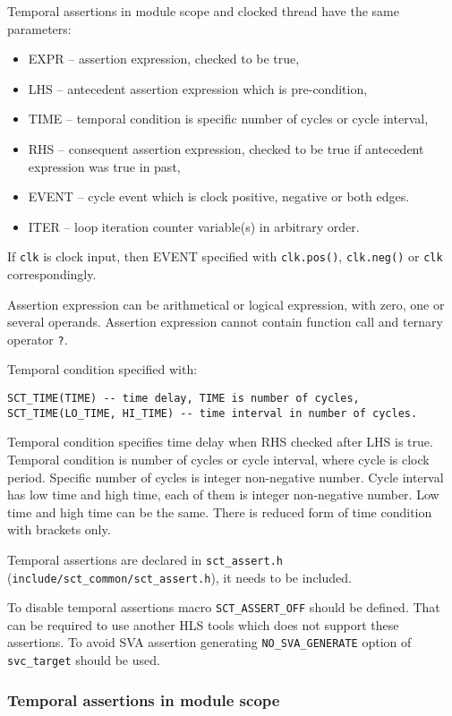 Temporal assertions in module scope and clocked thread have the same parameters:
\begin{itemize}
\item EXPR -- assertion expression, checked to be true,
\item LHS -- antecedent assertion expression which is pre-condition, 
\item TIME -- temporal condition is specific number of cycles or cycle interval,
\item RHS -- consequent assertion expression, checked to be true if antecedent expression was true in past,
\item EVENT -- cycle event which is clock positive, negative or both edges.
\item ITER -- loop iteration counter variable(s) in arbitrary order.
\end{itemize}

If {\tt clk} is clock input, then EVENT specified with {\tt clk.pos()}, {\tt clk.neg()} or {\tt clk} correspondingly. 

Assertion expression can be arithmetical or logical expression, with zero, one or several operands. Assertion expression cannot contain function call and ternary operator {\tt ?}.

Temporal condition specified with:
\begin{lstlisting}[style=mycpp]
SCT_TIME(TIME) -- time delay, TIME is number of cycles,
SCT_TIME(LO_TIME, HI_TIME) -- time interval in number of cycles.
\end{lstlisting}

Temporal condition specifies time delay when RHS checked after LHS is true. Temporal condition is number of cycles or cycle interval, where cycle is clock period. Specific number of cycles is integer non-negative number. Cycle interval has low time and high time, each of them is integer non-negative number. Low time and high time can be the same. There is reduced form of time condition with brackets only.

Temporal assertions are declared in {\tt sct\_assert.h} ({\tt include/sct\_common/sct\_assert.h}), it needs to be included. 

To disable temporal assertions macro {\tt SCT\_ASSERT\_OFF} should be defined. That can be required to use another HLS tools which does not support these assertions.
To avoid SVA assertion generating {\tt NO\_SVA\_GENERATE} option of {\tt svc\_target} should be used. 

\subsubsection{Temporal assertions in module scope}

